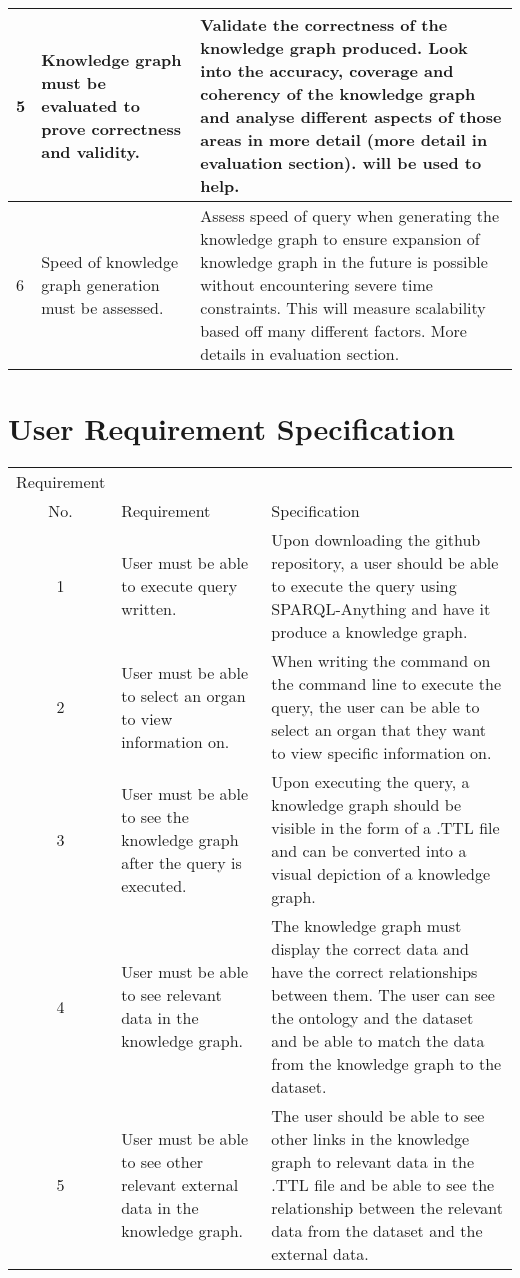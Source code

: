 \begin{longtable}{|p{2.25cm}|p{5.5cm}|p{5.5cm}|}
\hline
5&
Knowledge graph must be evaluated to prove correctness and validity. &
Validate the correctness of the knowledge graph produced. Look into the accuracy, coverage and coherency of the knowledge graph and analyse different aspects of those areas in more detail (more detail in evaluation section). \cite{knowledgegraphevaulationbook} will be used to help. \\ 
\hline
6&
Speed of knowledge graph generation must be assessed. &
Assess speed of query when generating the knowledge graph to ensure expansion of knowledge graph in the future is possible without encountering severe time constraints. This will measure scalability based off many different factors. More details in evaluation section. 
\hline
\end{longtable}

\begin{table}[h!]
\section{User Requirement Specification}
\begin{center}
\begin{tabular}{c|p{2in}p{2.55in}}
Requirement \\ No.&Requirement&Specification\\\hline 

1&
User must be able to execute query written. & 
Upon downloading the github repository, a user should be able to execute the query using SPARQL-Anything and have it produce a knowledge graph. \\

2& 
User must be able to select an organ to view information on. &
When writing the command on the command line to execute the query, the user can be able to select an organ that they want to view specific information on. \\

3&
User must be able to see the knowledge graph after the query is executed. &
Upon executing the query, a knowledge graph should be visible in the form of a .TTL file and can be converted into a visual depiction of a knowledge graph. \\

4&
User must be able to see relevant data in the knowledge graph. & 
The knowledge graph must display the correct data and have the correct relationships between them. The user can see the ontology and the dataset and be able to match the data from the knowledge graph to the dataset. \\

5&
User must be able to see other relevant external data in the knowledge graph. & 
The user should be able to see other links in the knowledge graph to relevant data in the .TTL file and be able to see the relationship between the relevant data from the dataset and the external data.

\end{tabular}
\end{center}
\end{table}
